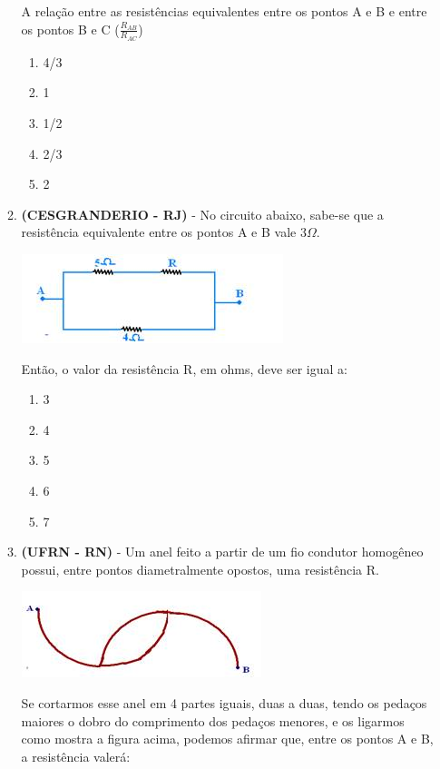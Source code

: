 \documentclass[12pt,letterpaper,fleqn]{article}
\begin{document}
\begin{itemize}
\begin{enumerate}
            A relação entre as resistências equivalentes entre os pontos A e B e entre os pontos B e C ($\frac{R_{AB}}{R_{AC}}$) 
            \begin{enumerate}
                \item 4/3
                \item 1
                \item 1/2
                \item 2/3
                \item 2
            \end{enumerate}
            
            \item \textbf{(CESGRANDERIO - RJ)} - No circuito abaixo, sabe-se que a resistência equivalente entre os pontos A e B vale 3$\Omega$.
            
            \includegraphics[]{circuito_cesgranderio_9.jpg}
            
            Então, o valor da resistência R, em ohms, deve ser igual a:
            \begin{enumerate}
                \item 3
                \item 4
                \item 5
                \item 6
                \item 7
            \end{enumerate}
            
            \item \textbf{(UFRN - RN)} - Um anel feito a partir de um fio condutor homogêneo possui, entre pontos diametralmente opostos, uma resistência R.
            
            \includegraphics[]{circuito_ufrn_14.jpg}
            
            Se cortarmos esse anel em 4 partes iguais, duas a duas, tendo os pedaços maiores o dobro do comprimento dos pedaços menores, e os ligarmos como mostra a figura acima, podemos afirmar que, entre os pontos A e B, a resistência valerá: 
            

\end{enumerate}
\end{itemize}
\end{document}
